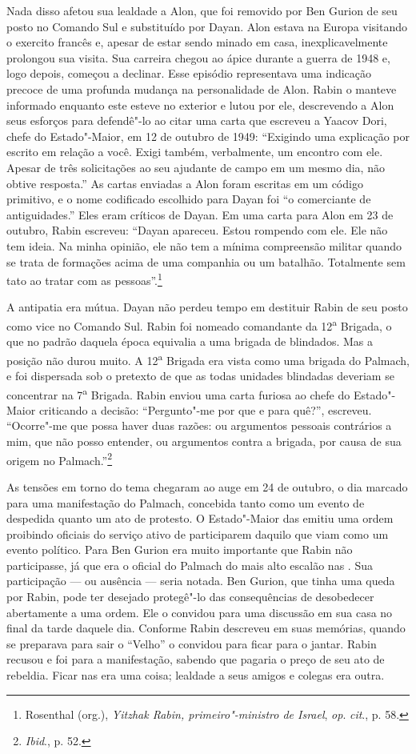 Nada disso afetou sua lealdade a Alon, que foi removido por Ben Gurion
de seu posto no Comando Sul e substituído por Dayan. Alon estava na
Europa visitando o exercito francês e, apesar de estar sendo minado em
casa, inexplicavelmente prolongou sua visita. Sua carreira chegou
ao ápice durante a guerra de 1948 e, logo depois, começou a declinar.
Esse episódio representava uma indicação precoce de uma profunda mudança
na personalidade de Alon. Rabin o manteve informado enquanto este
esteve no exterior e lutou por ele, descrevendo a Alon seus esforços
para defendê"-lo ao citar uma carta que escreveu a Yaacov Dori, chefe do
Estado"-Maior, em 12 de outubro de 1949: ``Exigindo uma explicação por
escrito em relação a você. Exigi também, verbalmente, um encontro com
ele. Apesar de três solicitações ao seu ajudante de campo em um mesmo
dia, não obtive resposta.'' As cartas enviadas a Alon foram escritas em
um código primitivo, e o nome codificado escolhido para Dayan foi ``o
comerciante de antiguidades.'' Eles eram críticos de Dayan. Em uma carta
para Alon em 23 de outubro, Rabin escreveu: ``Dayan apareceu. Estou
rompendo com ele. Ele não tem ideia. Na minha opinião, ele não tem a
mínima compreensão militar quando se trata de formações acima de uma
companhia ou um batalhão. Totalmente sem tato ao tratar com as
pessoas''.\footnote{Rosenthal (org.), \emph{Yitzhak Rabin, primeiro"-ministro de Israel}, \emph{op}. \emph{cit}., p. 58.}

A antipatia era mútua. Dayan não perdeu tempo em destituir Rabin de seu
posto como vice no Comando Sul. Rabin foi nomeado comandante da
12\textsuperscript{a} Brigada, o que no padrão daquela época equivalia a
uma brigada de blindados. Mas a posição não durou muito. A
12\textsuperscript{a} Brigada era vista como uma brigada do Palmach, e
foi dispersada sob o pretexto de que as todas unidades blindadas
deveriam se concentrar na 7\textsuperscript{a} Brigada. Rabin enviou
uma carta furiosa ao chefe do Estado"-Maior criticando a decisão: ``Pergunto"-me por que e para quê?'', escreveu. ``Ocorre"-me que possa
haver duas razões: ou argumentos pessoais contrários a mim, que não
posso entender, ou argumentos contra a brigada, por causa de sua origem
no Palmach.''\footnote{\emph{Ibid}., p. 52.}

As tensões em torno do tema chegaram ao auge em 24 de
outubro, o dia marcado para uma manifestação do Palmach, concebida tanto
como um evento de despedida quanto um ato de protesto. O Estado"-Maior
das  emitiu uma ordem proibindo oficiais do serviço ativo de
participarem daquilo que viam como um evento político. Para Ben Gurion
era muito importante que Rabin não participasse, já que era o oficial do
Palmach do mais alto escalão nas . Sua participação --- ou ausência ---
seria notada. Ben Gurion, que tinha uma queda por Rabin, pode ter
desejado protegê"-lo das consequências de desobedecer abertamente a uma
ordem. Ele o convidou para uma discussão em sua casa no final da tarde
daquele dia. Conforme Rabin descreveu em suas memórias, quando se
preparava para sair o ``Velho'' o convidou para ficar para o jantar.
Rabin recusou e foi para a manifestação, sabendo que pagaria o preço de
seu ato de rebeldia. Ficar nas  era uma coisa; lealdade a seus amigos
e colegas era outra.

